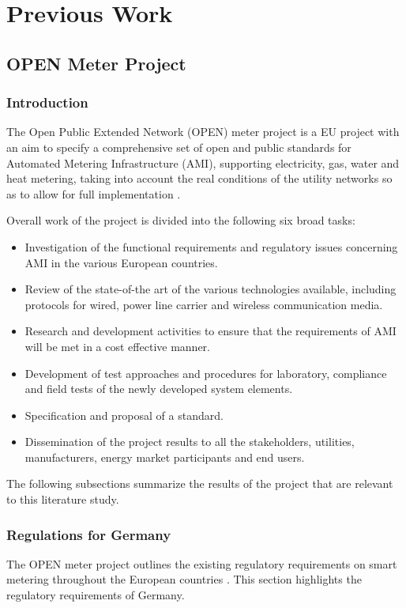 \chapter{Previous Work}
\section{OPEN Meter Project}
\subsection{Introduction}
The Open Public Extended Network (OPEN) meter project is a EU project with an aim to specify a comprehensive set of open and public standards for Automated Metering Infrastructure (AMI), supporting electricity, gas, water and heat metering, taking into account the real conditions of the utility networks so as to allow for full implementation \cite{OPEN_mtr_link}.

Overall work of the project is divided into the following six broad tasks: 
\begin{itemize}
\item Investigation of the functional requirements and regulatory issues concerning AMI in the various European countries.
\item Review of the state-of-the art of the various technologies available, including protocols for wired, power line carrier and wireless communication media.
\item Research and development activities to ensure that the requirements of AMI will be met in a cost effective manner.
\item Development of test approaches and procedures for laboratory, compliance and field tests of the newly developed system elements.
\item Specification and proposal of a standard.
\item Dissemination of the project results to all the stakeholders, utilities, manufacturers, energy market participants and end users.
\end{itemize}

The following subsections summarize the results of the project that are relevant to this literature study.

\subsection{Regulations for Germany}

The OPEN meter project outlines the existing regulatory requirements on smart metering throughout the European countries \cite{OPEN_mtr_reg}. This section highlights the regulatory requirements of Germany.


